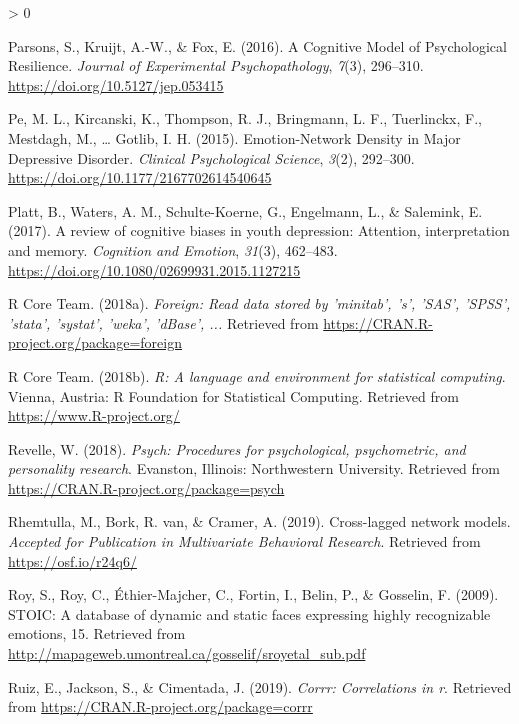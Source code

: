 \documentclass[
  english,
  man]{apa6}
\newlength{\cslhangindent}
\newenvironment{CSLReferences}[2] %
 {%
  \setlength{\parindent}{0pt}
  \ifodd #1 \everypar{\setlength{\hangindent}{\cslhangindent}}\ignorespaces\fi
  \ifnum #2 > 0
  \setlength{\parskip}{#2\baselineskip}
  \fi
 }%
 {}
\begin{document}
\begin{CSLReferences}{1}{0}
\leavevmode\hypertarget{ref-Parsons2016}{}%
Parsons, S., Kruijt, A.-W., \& Fox, E. (2016). A {Cognitive} {Model} of {Psychological} {Resilience}. \emph{Journal of Experimental Psychopathology}, \emph{7}(3), 296--310. \url{https://doi.org/10.5127/jep.053415}

\leavevmode\hypertarget{ref-pe_emotion-network_2015}{}%
Pe, M. L., Kircanski, K., Thompson, R. J., Bringmann, L. F., Tuerlinckx, F., Mestdagh, M., \ldots{} Gotlib, I. H. (2015). Emotion-{Network} {Density} in {Major} {Depressive} {Disorder}. \emph{Clinical Psychological Science}, \emph{3}(2), 292--300. \url{https://doi.org/10.1177/2167702614540645}

\leavevmode\hypertarget{ref-platt_review_2017}{}%
Platt, B., Waters, A. M., Schulte-Koerne, G., Engelmann, L., \& Salemink, E. (2017). A review of cognitive biases in youth depression: Attention, interpretation and memory. \emph{Cognition and Emotion}, \emph{31}(3), 462--483. \url{https://doi.org/10.1080/02699931.2015.1127215}

\leavevmode\hypertarget{ref-R-foreign}{}%
R Core Team. (2018a). \emph{Foreign: Read data stored by 'minitab', 's', 'SAS', 'SPSS', 'stata', 'systat', 'weka', 'dBase', ...} Retrieved from \url{https://CRAN.R-project.org/package=foreign}

\leavevmode\hypertarget{ref-R-base}{}%
R Core Team. (2018b). \emph{R: A language and environment for statistical computing}. Vienna, Austria: R Foundation for Statistical Computing. Retrieved from \url{https://www.R-project.org/}

\leavevmode\hypertarget{ref-R-psych}{}%
Revelle, W. (2018). \emph{Psych: Procedures for psychological, psychometric, and personality research}. Evanston, Illinois: Northwestern University. Retrieved from \url{https://CRAN.R-project.org/package=psych}

\leavevmode\hypertarget{ref-rhemtulla_cross-lagged_2019}{}%
Rhemtulla, M., Bork, R. van, \& Cramer, A. (2019). Cross-lagged network models. \emph{Accepted for Publication in Multivariate Behavioral Research}. Retrieved from \url{https://osf.io/r24q6/}

\leavevmode\hypertarget{ref-roy_stoic:_2009}{}%
Roy, S., Roy, C., Éthier-Majcher, C., Fortin, I., Belin, P., \& Gosselin, F. (2009). {STOIC}: {A} database of dynamic and static faces expressing highly recognizable emotions, 15. Retrieved from \url{http://mapageweb.umontreal.ca/gosselif/sroyetal_sub.pdf}

\leavevmode\hypertarget{ref-R-corrr}{}%
Ruiz, E., Jackson, S., \& Cimentada, J. (2019). \emph{Corrr: Correlations in r}. Retrieved from \url{https://CRAN.R-project.org/package=corrr}


\end{CSLReferences}
\end{document}
